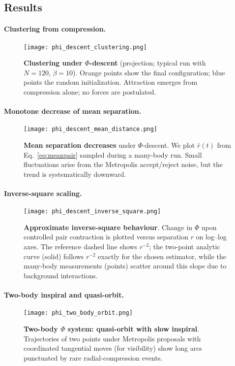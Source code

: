 \documentclass[aps,preprint,onecolumn,longbibliography,nofootinbib]{revtex4-2}
\numberwithin{equation}{section}        %
\begin{document}
\subsection{Results}
\paragraph*{Clustering from compression.}
\begin{figure}[H]
\centering
\texttt{[image: phi\_descent\_clustering.png]}
\caption{\textbf{Clustering under $\Phi$-descent} (projection; typical run with $N{=}120$, $\beta{=}10$). Orange points show the final configuration; blue points the random initialization. Attraction emerges from compression alone; no forces are postulated.}
\label{fig:clustering}
\end{figure}

\paragraph*{Monotone decrease of mean separation.}
\begin{figure}[H]
\centering
\texttt{[image: phi\_descent\_mean\_distance.png]}
\caption{\textbf{Mean separation decreases} under $\Phi$-descent. We plot $\bar r(t)$ from Eq.~\eqref{eq:meanpair} sampled during a many-body run. Small fluctuations arise from the Metropolis accept/reject noise, but the trend is systematically downward.}
\label{fig:mean}
\end{figure}

\paragraph*{Inverse-square scaling.}
\begin{figure}[H]
\centering
\texttt{[image: phi\_descent\_inverse\_square.png]}
\caption{\textbf{Approximate inverse-square behaviour}. Change in $\Phi$ upon controlled pair contraction is plotted versus separation $r$ on log--log axes. The reference dashed line shows $r^{-2}$; the two-point analytic curve (solid) follows $r^{-2}$ exactly for the chosen estimator, while the many-body measurements (points) scatter around this slope due to background interactions.}
\label{fig:inverse}
\end{figure}

\paragraph*{Two-body inspiral and quasi-orbit.}
\begin{figure}[H]
\centering
\texttt{[image: phi\_two\_body\_orbit.png]}
\caption{\textbf{Two-body $\Phi$ system: quasi-orbit with slow inspiral}. Trajectories of two points under Metropolis proposals with coordinated tangential moves (for visibility) show long arcs punctuated by rare radial-compression events.}
\label{fig:twoorbit}
\end{figure}
\end{document}
